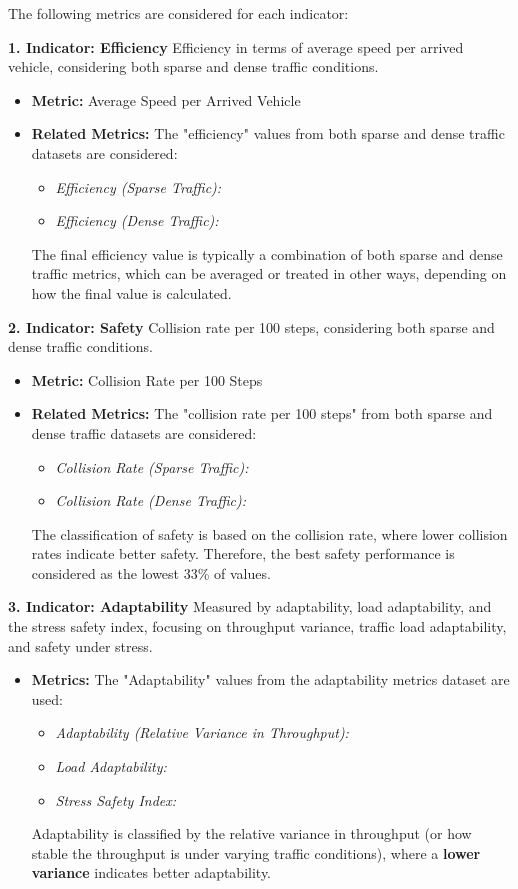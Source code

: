 The following metrics are considered for each indicator:

\textbf{1. Indicator: Efficiency}
Efficiency in terms of average speed per arrived vehicle, considering both sparse and dense traffic conditions.
\begin{itemize}
    \item\textbf{Metric:} Average Speed per Arrived Vehicle
    \item \textbf{Related Metrics:} The "efficiency" values from both sparse and dense traffic datasets are considered:
    \begin{itemize}
        \item \textit{Efficiency (Sparse Traffic):} 
        \item \textit{Efficiency (Dense Traffic):} 
    \end{itemize}
    The final efficiency value is typically a combination of both sparse and dense traffic metrics, which can be averaged or treated in other ways, depending on how the final value is calculated.
\end{itemize}

\textbf{2. Indicator: Safety}
Collision rate per 100 steps, considering both sparse and dense traffic conditions.
\begin{itemize}
    \item \textbf{Metric:} Collision Rate per 100 Steps
    \item \textbf{Related Metrics:} The "collision rate per 100 steps" from both sparse and dense traffic datasets are considered:
    \begin{itemize}
        \item \textit{Collision Rate (Sparse Traffic):} 
        \item \textit{Collision Rate (Dense Traffic):} 
    \end{itemize}
    The classification of safety is based on the collision rate, where lower collision rates indicate better safety. Therefore, the best safety performance is considered as the lowest 33\% of values.
\end{itemize}

\textbf{3. Indicator: Adaptability}
Measured by adaptability, load adaptability, and the stress safety index, focusing on throughput variance, traffic load adaptability, and safety under stress.
\begin{itemize}
    \item \textbf{Metrics:} The "Adaptability" values from the adaptability metrics dataset are used:
    \begin{itemize}
        \item \textit{Adaptability (Relative Variance in Throughput):} 
        \item \textit{Load Adaptability:} 
        \item \textit{Stress Safety Index:} 
    \end{itemize}
    Adaptability is classified by the relative variance in throughput (or how stable the throughput is under varying traffic conditions), where a \textbf{lower variance} indicates better adaptability.
\end{itemize}

